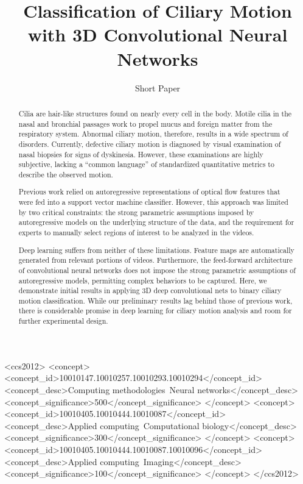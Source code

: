 \documentclass[sigconf]{acmart}
\begin{document}
\title{Classification of Ciliary Motion with 3D Convolutional Neural Networks}
\subtitle{Short Paper}


\begin{abstract}
Cilia are hair-like structures found on nearly every cell in the body. Motile cilia in the nasal and bronchial passages work to propel mucus and foreign matter from the respiratory system. Abnormal ciliary motion, therefore, results in a wide spectrum of disorders. Currently, defective ciliary motion is diagnosed by visual examination of nasal biopsies for signs of dyskinesia. However, these examinations are highly subjective, lacking a ``common language'' of standardized quantitative metrics to describe the observed motion.

Previous work relied on autoregressive representations of optical flow features that were fed into a support vector machine classifier. However, this approach was limited by two critical constraints: the strong parametric assumptions imposed by autoregressive models on the underlying structure of the data, and the requirement for experts to manually select regions of interest to be analyzed in the videos.

Deep learning suffers from neither of these limitations. Feature maps are automatically generated from relevant portions of videos. Furthermore, the feed-forward architecture of convolutional neural networks does not impose the strong parametric assumptions of autoregressive models, permitting complex behaviors to be captured. Here, we demonstrate initial results in applying 3D deep convolutional nets to binary ciliary motion classification. While our preliminary results lag behind those of previous work, there is considerable promise in deep learning for ciliary motion analysis and room for further experimental design.

\end{abstract}

%
%
\begin{CCSXML}
<ccs2012>
<concept>
<concept_id>10010147.10010257.10010293.10010294</concept_id>
<concept_desc>Computing methodologies~Neural networks</concept_desc>
<concept_significance>500</concept_significance>
</concept>
<concept>
<concept_id>10010405.10010444.10010087</concept_id>
<concept_desc>Applied computing~Computational biology</concept_desc>
<concept_significance>300</concept_significance>
</concept>
<concept>
<concept_id>10010405.10010444.10010087.10010096</concept_id>
<concept_desc>Applied computing~Imaging</concept_desc>
<concept_significance>100</concept_significance>
</concept>
</ccs2012>
\end{CCSXML}
\end{document}

